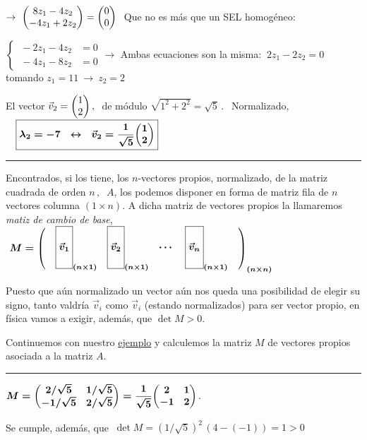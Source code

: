 $\to \  \mqty(8z_1-4z_2\\-4z_1+2z_2)=\mqty(0\\0)\ $ Que no es más que un  SEL homogéneo:

$\begin{cases} \ -2z_1-4z_2 & =0 \\ \ -4z_1-8z_2 &=0 \end{cases} \to $ Ambas ecuaciones son la misma: $\ 2z_1-2z_2=0 \, \  $ tomando $z_1=11 \ \to \ z_2=2$

El vector $\vec v_2=\mqty(1\\2)\, , \ $ de módulo $\sqrt{1^2+2^2}=\sqrt{5}\, . \ \ $ Normalizado, 
$\quad \boxed{\boldsymbol{ \lambda_2= -7 \ \ \leftrightarrow \ \  \vec v_2=\dfrac{1}{\sqrt{5}} \mqty(1\\2)}}$

\begin{center}
	\rule{200pt}{0.1pt}
\end{center}

\color{black}
Encontrados, si los tiene, los $n$-vectores propios, normalizado,  de la matriz cuadrada de orden $n\, , \ $ $A$, los podemos disponer en forma de matriz fila de $n$ vectores columna $(1\times n)$. A dicha matriz de vectores propios la llamaremos \emph{matiz de cambio de base}, 
$\ \boldsymbol{ M=\mqty ( & \boxed{ \mqty{   \\  \vec v_1   \\ \, } }_{(n\times 1)}  & \boxed{ \mqty{   \\  \vec v_2   \\ \, } }_{(n\times 1)}  & \cdots \  & \boxed{ \mqty{   \\  \vec v_n   \\ \, } }_{(n\times 1)} & )_{(n\times n)} } \ $

Puesto que aún normalizado un vector aún nos queda una posibilidad de elegir su signo, tanto valdría $\vec v_i$ como $\vec v_i$ (estando normalizados) para ser vector propio, en física vamos a exigir, además, que $\det M>0$.

\vspace{5mm}
\color{gris}

Continuemos con nuestro \underline{ejemplo} y calculemos la matriz $M$ de vectores propios asociada a la matriz $A$.

\rule{200pt}{0.1pt}

$\boldsymbol{ M=\mqty( 2/\sqrt{5} & 1/\sqrt{5} \\ -1/\sqrt{5} & 2/\sqrt{5} )=\dfrac 1{\sqrt{5}} \mqty(2&1\\-1&2)}\, . \ $ \begin{small} Se cumple, además, que $\ \det M=(1/\sqrt{5})^2 \, (4-(-1))=1>0$ \end{small}

